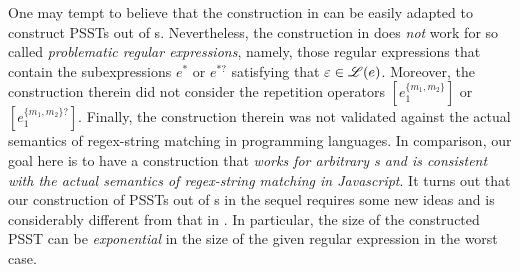 One may tempt to believe that the construction in \cite{BDM14,BM17} can be easily adapted to construct PSSTs out of {\pcre}s. 
%
Nevertheless, the construction in \cite{BDM14,BM17} does \emph{not} work for so called \emph{problematic regular expressions}, namely,  those regular expressions that contain the subexpressions $e^*$ or $e^{*?}$ satisfying that  $\varepsilon \in \mathscr{L}(e)$. Moreover, the construction therein did not consider the repetition operators $[e_1^{\{m_1,m_2\}}]$ or $[e_1^{\{m_1,m_2\}?}]$. Finally, the construction therein was not validated against the actual semantics of regex-string matching in programming languages. 
%
In comparison, our goal here is to have a construction that \emph{works for arbitrary {\pcre}s and is consistent with the actual semantics of  regex-string matching in Javascript}. It turns out that our construction of PSSTs out of {\pcre}s in the sequel requires some new ideas and is considerably different from that in  \cite{BDM14,BM17}. In particular, the size of the constructed PSST can be \emph{exponential} in the size of the given regular expression in the worst case.

%
% 

%		

